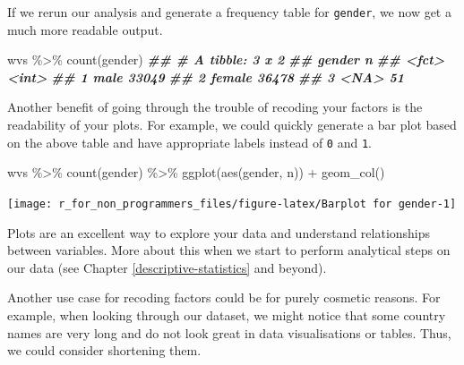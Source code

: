 \documentclass[
]{book}
\newenvironment{Shaded}{\begin{snugshade}}{\end{snugshade}}
\newcommand{\DocumentationTok}[1]{\textcolor[rgb]{0.56,0.35,0.01}{\textbf{\textit{#1}}}}
\newcommand{\FunctionTok}[1]{\textcolor[rgb]{0.00,0.00,0.00}{#1}}
\newcommand{\NormalTok}[1]{#1}
\newcommand{\SpecialCharTok}[1]{\textcolor[rgb]{0.00,0.00,0.00}{#1}}
\begin{document}
If we rerun our analysis and generate a frequency table for \texttt{gender}, we now get a much more readable output.

\begin{Shaded}
\begin{Highlighting}[]
\NormalTok{wvs }\SpecialCharTok{\%\textgreater{}\%} \FunctionTok{count}\NormalTok{(gender)}
\DocumentationTok{\#\# \# A tibble: 3 x 2}
\DocumentationTok{\#\#   gender     n}
\DocumentationTok{\#\#   \textless{}fct\textgreater{}  \textless{}int\textgreater{}}
\DocumentationTok{\#\# 1 male   33049}
\DocumentationTok{\#\# 2 female 36478}
\DocumentationTok{\#\# 3 \textless{}NA\textgreater{}      51}
\end{Highlighting}
\end{Shaded}

Another benefit of going through the trouble of recoding your factors is the readability of your plots. For example, we could quickly generate a bar plot based on the above table and have appropriate labels instead of \texttt{0} and \texttt{1}.

\begin{Shaded}
\begin{Highlighting}[]
\NormalTok{wvs }\SpecialCharTok{\%\textgreater{}\%} \FunctionTok{count}\NormalTok{(gender) }\SpecialCharTok{\%\textgreater{}\%} 
  \FunctionTok{ggplot}\NormalTok{(}\FunctionTok{aes}\NormalTok{(gender, n)) }\SpecialCharTok{+} 
  \FunctionTok{geom\_col}\NormalTok{()}
\end{Highlighting}
\end{Shaded}

\begin{center}\texttt{[image: r\_for\_non\_programmers\_files/figure-latex/Barplot for gender-1]} \end{center}

Plots are an excellent way to explore your data and understand relationships between variables. More about this when we start to perform analytical steps on our data (see Chapter \ref{descriptive-statistics} and beyond).

Another use case for recoding factors could be for purely cosmetic reasons. For example, when looking through our dataset, we might notice that some country names are very long and do not look great in data visualisations or tables. Thus, we could consider shortening them.
\end{document}
